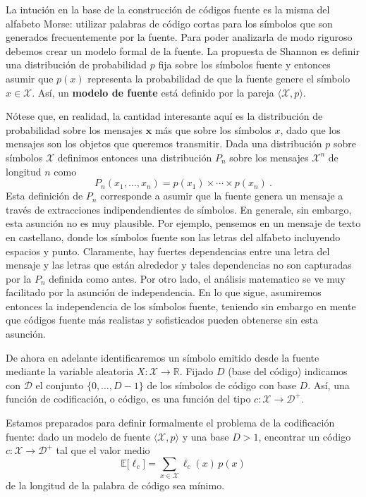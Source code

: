 \documentclass[11pt]{article}
\newcommand{\bx}{ \boldsymbol{x} }
\newcommand{\scD}{\mathcal{D}}
\newcommand{\scX}{\mathcal{X}}
\newcommand{\field}[1]{\mathbb{#1}}
\newcommand{\R}{\field{R}}
\newcommand{\E}{\field{E}}
\begin{document}
La intución en la base de la construcción de códigos fuente es la misma del alfabeto Morse: utilizar palabras de código cortas para los símbolos que son generados frecuentemente por la fuente. Para poder analizarla de modo riguroso debemos crear un modelo formal de la fuente. La propuesta de Shannon es definir una distribución de probabilidad $p$ fija sobre los símbolos fuente y entonces asumir que $p(x)$ representa la probabilidad de que la fuente genere el símbolo $x\in\scX$. Así, un \textbf{modelo de fuente} está definido por la pareja $\langle\scX,p\rangle$.

Nótese que, en realidad, la cantidad interesante aquí es la distribución de probabilidad sobre los mensajes $\bx$ más que sobre los símbolos $x$, dado que los mensajes son los objetos que queremos transmitir. Dada una distribución $p$ sobre símbolos $\scX$ definimos entonces una distribución $P_n$ sobre los mensajes $\scX^n$ de longitud $n$ como
\[
    P_n(x_1,\dots,x_n) = p(x_1) \times\cdots\times p(x_n)~.
\]
Esta definición de $P_n$ corresponde a asumir que la fuente genera un mensaje a través de extracciones indipendendientes de símbolos. En generale, sin embargo, esta asunción no es muy plausible. Por ejemplo, pensemos en un mensaje de texto en castellano, donde los símbolos fuente son las letras del alfabeto incluyendo espacios y punto. Claramente, hay fuertes dependencias entre una letra del mensaje y las letras que están alrededor y tales dependencias no son capturadas por la $P_n$ definida como antes. Por otro lado, el análisis matematico se ve muy facilitado por la asunción de independencia. En lo que sigue, asumiremos entonces la independencia de los símbolos fuente, teniendo sin embargo en mente que códigos fuente más realistas y sofisticados pueden obtenerse sin esta asunción.

De ahora en adelante identificaremos un símbolo emitido desde la fuente mediante la variable aleatoria $X : \scX\to\R$.
Fijado $D$ (base del código) indicamos con $\scD$ el conjunto $\{0,\dots,D-1\}$ de los símbolos de código con base $D$. Así, una función de codificación, o código, es una función del tipo $c : \scX\to\scD^+$.

Estamos preparados para definir formalmente el problema de la codificación fuente: dado un modelo de fuente $\langle\scX,p\rangle$ y una base $D > 1$, encontrar un código $c : \scX\to\scD^+$ tal que el valor medio
\begin{equation}
\label{eq:source-coding}
    \E\bigl[\ell_c\bigr] = \sum_{x\in\scX} \ell_c(x)\,p(x)
\end{equation}
de la longitud de la palabra de código sea mínimo.
\end{document}
